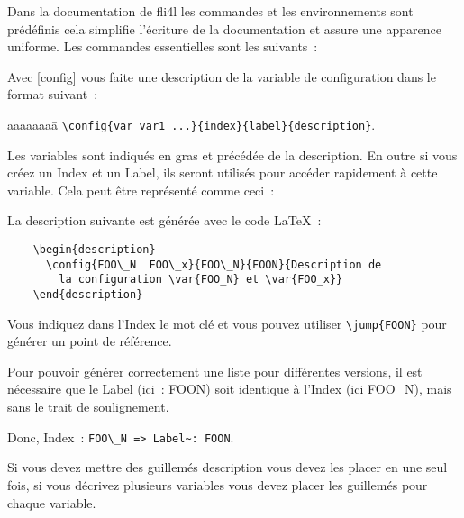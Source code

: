 Dans la documentation de fli4l les commandes et les environnements sont
prédéfinis cela simplifie l'écriture de la documentation et assure une apparence
uniforme. Les commandes essentielles sont les suivants~:

\begin{description}
\item Avec [config] vous faite une description de la variable de configuration
dans le format suivant~:
  \begin{tabbing}
    aaaaaaaa\=\kill
    \>\verb*?\config{var var1 ...}{index}{label}{description}?.
  \end{tabbing}

  Les variables sont indiqués en gras et précédée de la description. En outre
  si vous créez un Index et un Label, ils seront utilisés pour accéder rapidement
  à cette variable. Cela peut être représenté comme ceci~:

  \begin{description}
  \end{description}

La description suivante est générée avec le code \LaTeX~:

\begin{verbatim}
    \begin{description}
      \config{FOO\_N  FOO\_x}{FOO\_N}{FOON}{Description de
        la configuration \var{FOO_N} et \var{FOO_x}}
    \end{description}
\end{verbatim}

  Vous indiquez dans l'Index le mot clé  et vous pouvez utiliser
  \verb*?\jump{FOON}? pour générer un point de référence.

  Pour pouvoir générer correctement une liste pour différentes versions, il
  est nécessaire que le Label (ici~: FOON) soit identique à l'Index
  (ici FOO\_N), mais sans le trait de soulignement.

  Donc, Index~: \verb?FOO\_N => Label~: FOON?.

  Si vous devez mettre des guillemés \frqq{}description\frqq{} vous devez les
  placer en une seul fois, si vous décrivez plusieurs variables vous devez
  placer les guillemés pour chaque variable.


\end{description}
